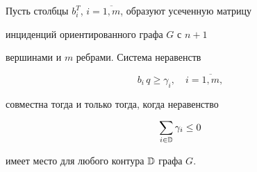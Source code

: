 \begin{thm}


Пусть столбцы $b_i^T$, $i=\overline{1,m}$, образуют усеченную матрицу


инциденций {} ориентированного графа $G$ с $n+1$


вершинами и $m$ ребрами. Система неравенств


\begin{equation}


b_i\,q\ge\gamma_i,\quad i=\overline{1,m}, %


\end{equation}


совместна тогда и только тогда, когда неравенство


\begin{equation}


\sum_{i\in \Bbb D}\gamma_i\le 0 %


\end{equation}


имеет место для любого контура $\Bbb D$ графа $G$.


\end{thm}





